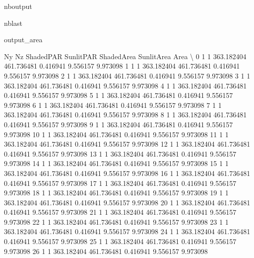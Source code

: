 \documentclass[letterpaper,10pt,english]{sphinxmanual}
\begin{document}
\begin{sphinxuseclass}{nboutput}
\begin{sphinxuseclass}{nblast}
{\begin{sphinxuseclass}{output_area}
\begin{sphinxuseclass}{}
\begin{sphinxVerbatim}[commandchars=\\\{\}]
    Ny  Nz   ShadedPAR   SunlitPAR  ShadedArea  SunlitArea      Area  \textbackslash{}
0    1   1  363.182404  461.736481    0.416941    9.556157  9.973098
1    1   1  363.182404  461.736481    0.416941    9.556157  9.973098
2    1   1  363.182404  461.736481    0.416941    9.556157  9.973098
3    1   1  363.182404  461.736481    0.416941    9.556157  9.973098
4    1   1  363.182404  461.736481    0.416941    9.556157  9.973098
5    1   1  363.182404  461.736481    0.416941    9.556157  9.973098
6    1   1  363.182404  461.736481    0.416941    9.556157  9.973098
7    1   1  363.182404  461.736481    0.416941    9.556157  9.973098
8    1   1  363.182404  461.736481    0.416941    9.556157  9.973098
9    1   1  363.182404  461.736481    0.416941    9.556157  9.973098
10   1   1  363.182404  461.736481    0.416941    9.556157  9.973098
11   1   1  363.182404  461.736481    0.416941    9.556157  9.973098
12   1   1  363.182404  461.736481    0.416941    9.556157  9.973098
13   1   1  363.182404  461.736481    0.416941    9.556157  9.973098
14   1   1  363.182404  461.736481    0.416941    9.556157  9.973098
15   1   1  363.182404  461.736481    0.416941    9.556157  9.973098
16   1   1  363.182404  461.736481    0.416941    9.556157  9.973098
17   1   1  363.182404  461.736481    0.416941    9.556157  9.973098
18   1   1  363.182404  461.736481    0.416941    9.556157  9.973098
19   1   1  363.182404  461.736481    0.416941    9.556157  9.973098
20   1   1  363.182404  461.736481    0.416941    9.556157  9.973098
21   1   1  363.182404  461.736481    0.416941    9.556157  9.973098
22   1   1  363.182404  461.736481    0.416941    9.556157  9.973098
23   1   1  363.182404  461.736481    0.416941    9.556157  9.973098
24   1   1  363.182404  461.736481    0.416941    9.556157  9.973098
25   1   1  363.182404  461.736481    0.416941    9.556157  9.973098
26   1   1  363.182404  461.736481    0.416941    9.556157  9.973098


\end{sphinxVerbatim}
\end{sphinxuseclass}
\end{sphinxuseclass}}
\end{sphinxuseclass}
\end{sphinxuseclass}
\end{document}
